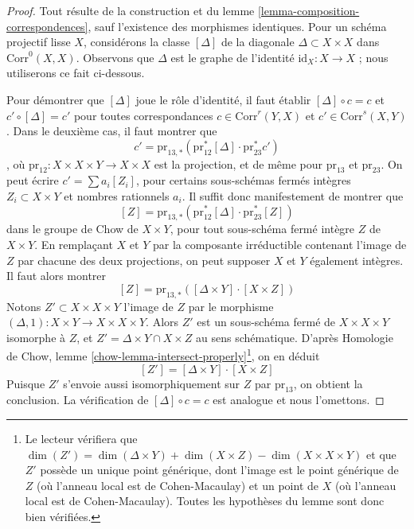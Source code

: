 \begin{proof}
Tout résulte de la construction et du
lemme \ref{lemma-composition-correspondences},
sauf l'existence des morphismes identiques.
Pour un schéma projectif lisse $X$, considérons
la classe $[\Delta]$ de la diagonale $\Delta \subset X \times X$
dans $\text{Corr}^0(X, X)$. Observons que $\Delta$
est le graphe de l'identité $\text{id}_X : X \to X$ ;
nous utiliserons ce fait ci-dessous.

\medskip\noindent
Pour démontrer que $[\Delta]$ joue le rôle d'identité, il faut établir
$[\Delta] \circ c = c$ et $c' \circ [\Delta] = c'$ pour toutes correspondances
$c \in \text{Corr}^r(Y, X)$ et $c' \in \text{Corr}^s(X, Y)$.
Dans le deuxième cas, il faut montrer que
$$
c' = \text{pr}_{13, *}(\text{pr}_{12}^*[\Delta] \cdot \text{pr}_{23}^*c')
$$,
où $\text{pr}_{12} : X \times X \times Y \to X \times X$ est la
projection, et de même pour $\text{pr}_{13}$ et $\text{pr}_{23}$.
On peut écrire $c' = \sum a_i [Z_i]$, pour certains sous-schémas fermés intègres
$Z_i \subset X \times Y$ et nombres rationnels $a_i$. Il suffit donc
manifestement de montrer que
$$
[Z] = \text{pr}_{13, *}(\text{pr}_{12}^*[\Delta] \cdot \text{pr}_{23}^*[Z])
$$
dans le groupe de Chow de $X \times Y$, pour tout sous-schéma fermé intègre $Z$
de $X \times Y$. En remplaçant $X$ et $Y$ par
la composante irréductible contenant l'image de $Z$ par chacune des deux projections,
on peut supposer $X$ et $Y$ également intègres. Il faut alors montrer
$$
[Z] = \text{pr}_{13, *}([\Delta \times Y] \cdot [X \times Z])
$$
Notons $Z' \subset X \times X \times Y$ l'image de $Z$ par le morphisme
$(\Delta, 1) : X \times Y \to X \times X \times Y$. Alors $Z'$
est un sous-schéma fermé de $X \times X \times Y$ isomorphe à $Z$, et
$Z' = \Delta \times Y \cap X \times Z$ au sens schématique.
D'après Homologie de Chow, lemme \ref{chow-lemma-intersect-properly}\footnote{Le
lecteur vérifiera que $\dim(Z') = \dim(\Delta \times Y) + \dim(X \times Z) -
\dim(X \times X \times Y)$ et que $Z'$ possède un unique point générique,
dont l'image est le point générique de $Z$ (où l'anneau local est de Cohen-Macaulay)
et un point de $X$ (où l'anneau local est de Cohen-Macaulay).
Toutes les hypothèses du lemme sont donc bien vérifiées.},
on en déduit
$$
[Z'] = [\Delta \times Y] \cdot [X \times Z]
$$
Puisque $Z'$ s'envoie aussi isomorphiquement sur $Z$ par $\text{pr}_{13}$,
on obtient la conclusion. La vérification de
$[\Delta] \circ c = c$ est analogue et nous l'omettons.
\end{proof}

